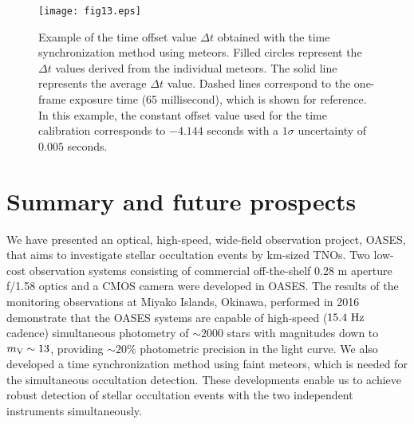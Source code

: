 \documentclass{pasj01}
\begin{document}
\begin{figure}[!pt]
\begin{center}
   \texttt{[image: fig13.eps]}
   \caption{Example of the time offset value $\Delta t$ obtained 
   with the time synchronization method using meteors.
   Filled circles represent the $\Delta t$ values derived from the individual meteors.
   The solid line represents the average $\Delta t$ value.
   Dashed lines correspond to the one-frame exposure time (65 millisecond),
   which is shown for reference.
   In this example, the constant offset value used for the time calibration 
   corresponds to $-4.144$ seconds with a $1\sigma$ uncertainty of $0.005$ seconds. 
  }
   \label{fig45}
 \end{center}
\end{figure}


\section{Summary and future prospects}

We have presented an optical, high-speed, wide-field
observation project, OASES,
that aims to investigate stellar occultation events by km-sized TNOs.
Two low-cost observation systems 
consisting of commercial off-the-shelf 0.28 m aperture f/1.58 optics 
and a CMOS camera  were developed in OASES.
The results of the monitoring observations at Miyako Islands, Okinawa, performed in 2016
demonstrate that the OASES systems are capable of high-speed ($15.4 \ {\rm Hz}$ cadence) 
simultaneous photometry of $\sim 2000$ stars with magnitudes down to $m_{\rm V} \sim 13$, 
providing $\sim 20\%$ photometric precision in the light curve. 
We also developed a time synchronization method 
using faint meteors, which is needed for the 
simultaneous occultation detection.
These developments enable us to achieve robust 
detection of stellar occultation events 
with the two independent instruments simultaneously.
\end{document}

